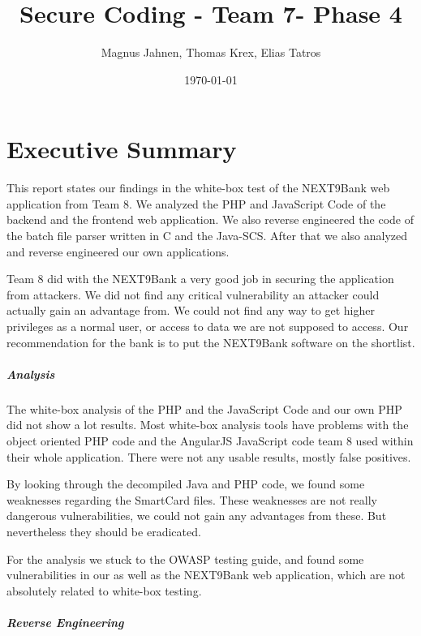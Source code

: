 \documentclass{report}
\title{Secure Coding - Team 7- Phase 4}
\author{Magnus Jahnen, Thomas Krex, Elias Tatros}
\date{\today}
\begin{document}
\maketitle

\part{Executive Summary}

This report states our findings in the white-box test of the NEXT9Bank web application from Team 8. We analyzed the PHP and JavaScript Code of the backend and the frontend web application. We also reverse engineered the code of the batch file parser written in C and the Java-SCS. After that we also analyzed and reverse engineered our own applications.

Team 8 did with the NEXT9Bank a very good job in securing the application from attackers. We did not find any critical vulnerability an attacker could actually gain an advantage from. We could not find any way to get higher privileges as a normal user, or access to data we are not supposed to access. Our recommendation for the bank is to put the NEXT9Bank software on the shortlist.

\subsubsection{Analysis}

The white-box analysis of the PHP and the JavaScript Code and our own PHP did not show a lot results. Most white-box analysis tools have problems with the object oriented PHP code and the AngularJS JavaScript code team 8 used within their whole application. There were not any usable results, mostly false positives.

By looking through the decompiled Java and PHP code, we found some weaknesses regarding the SmartCard files. These weaknesses are not really dangerous vulnerabilities, we could not gain any advantages from these. But nevertheless they should be eradicated.

For the analysis we stuck to the OWASP testing guide, and found some vulnerabilities in our as well as the NEXT9Bank web application, which are not absolutely related to white-box testing.

\subsubsection{Reverse Engineering}
\end{document}
